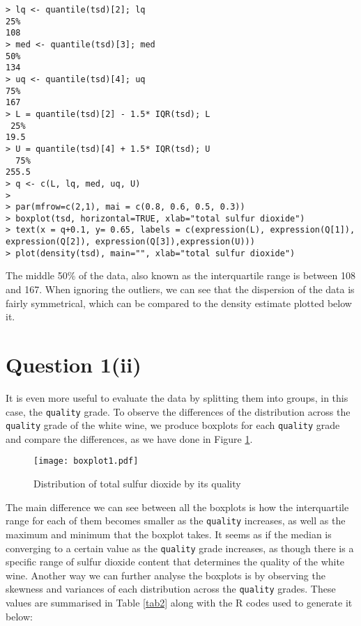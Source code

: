 \documentclass[11pt,a4]{article}
\begin{document}
\begin{verbatim}
> lq <- quantile(tsd)[2]; lq
25% 
108 
> med <- quantile(tsd)[3]; med
50% 
134 
> uq <- quantile(tsd)[4]; uq
75% 
167 
> L = quantile(tsd)[2] - 1.5* IQR(tsd); L
 25% 
19.5 
> U = quantile(tsd)[4] + 1.5* IQR(tsd); U
  75% 
255.5 
> q <- c(L, lq, med, uq, U)
> 
> par(mfrow=c(2,1), mai = c(0.8, 0.6, 0.5, 0.3))
> boxplot(tsd, horizontal=TRUE, xlab="total sulfur dioxide")
> text(x = q+0.1, y= 0.65, labels = c(expression(L), expression(Q[1]), expression(Q[2]), expression(Q[3]),expression(U)))
> plot(density(tsd), main="", xlab="total sulfur dioxide")
\end{verbatim}

The middle 50\% of the data, also known as the interquartile range is between 108 and 167. When ignoring the outliers, we can see that the dispersion of the data is fairly symmetrical, which can be compared to the density estimate plotted below it. 

\bigskip

\section{Question 1(ii)}
It is even more useful to evaluate the data by splitting them into groups, in this case, the \verb|quality| grade. To observe the differences of the distribution across the \verb|quality| grade of the white wine, we produce boxplots for each \verb|quality| grade and compare the differences, as we have done in Figure \ref{fig2}.

\begin{figure}[hbt!]
    \centering
    \texttt{[image: boxplot1.pdf]}
    \caption{Distribution of total sulfur dioxide by its quality}
    \label{fig2}
\end{figure}

\bigskip

The main difference we can see between all the boxplots is how the interquartile range for each of them becomes smaller as the \verb|quality| increases, as well as the maximum and minimum that the boxplot takes. It seems as if the median is converging to a certain value as the \verb|quality| grade increases, as though there is a specific range of sulfur dioxide content that determines the quality of the white wine. Another way we can further analyse the boxplots is by observing the skewness and variances of each distribution across the \verb|quality| grades. These values are summarised in Table \ref{tab2} along with the R codes used to generate it below:
\end{document}
